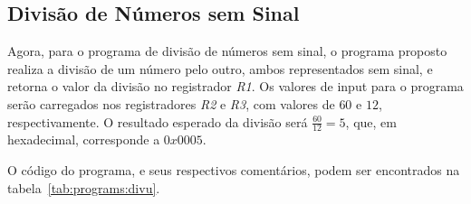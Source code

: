 \documentclass[12pt]{article}
\begin{document}
\subsection{Divisão de Números sem Sinal}\label{sec:programs:divu}

Agora, para o programa de divisão de números sem sinal, o programa proposto
realiza a divisão de um número pelo outro, ambos representados sem sinal, e
retorna o valor da divisão no registrador \emph{R1}. Os valores de input para o
programa serão carregados nos registradores \emph{R2} e \emph{R3}, com valores
de $60$ e $12$, respectivamente. O resultado esperado da divisão será
$\frac{60}{12} = 5$, que, em hexadecimal, corresponde a $0x0005$.

O código do programa, e seus respectivos comentários, podem ser encontrados na
tabela~\ref{tab:programs:divu}.
\end{document}
